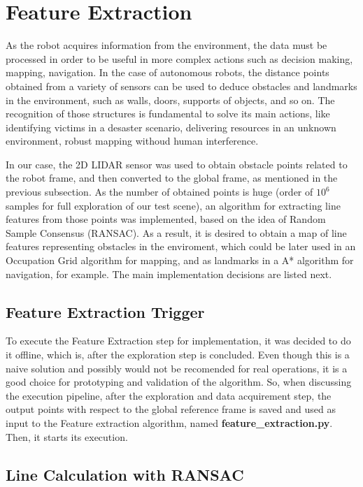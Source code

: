 \documentclass[twoside,conference,a4paper]{IEEEtran}
\begin{document}
\section{Feature Extraction}

As the robot acquires information from the environment, the data must be processed in order to be useful in more complex actions such as decision making, mapping, navigation. In the case of autonomous robots, the distance points obtained from a variety of sensors can be used to deduce obstacles and landmarks in the environment, such as walls, doors, supports of objects, and so on. The recognition of those structures is fundamental to solve its main actions, like identifying victims in a desaster scenario, delivering resources in an unknown environment, robust mapping withoud human interference.
\par In our case, the 2D LIDAR sensor was used to obtain obstacle points related to the robot frame, and then converted to the global frame, as mentioned in the previous subsection. As the number of obtained points is huge (order of $10^{6}$ samples for full exploration of our test scene), an algorithm for extracting line features from those points was implemented, based on the idea of Random Sample Consensus (RANSAC\cite{fischler1981random}). As a result, it is desired to obtain a map of line features representing obstacles in the enviroment, which could be later used in an Occupation Grid algorithm for mapping, and as landmarks in a A* algorithm for navigation, for example. The main implementation decisions are listed next. 

\subsection{Feature Extraction Trigger}
To execute the Feature Extraction step for implementation, it was decided to do it offline, which is, after the exploration step is concluded. Even though this is a naive solution and possibly would not be recomended for real operations, it is a good choice for prototyping and validation of the algorithm. So, when discussing the execution pipeline, after the exploration and data acquirement step, the output points with respect to the global reference frame is saved and used as input to the Feature extraction algorithm, named \textbf{feature\_extraction.py}. Then, it starts its execution.

\subsection{Line Calculation with RANSAC}
\end{document}

